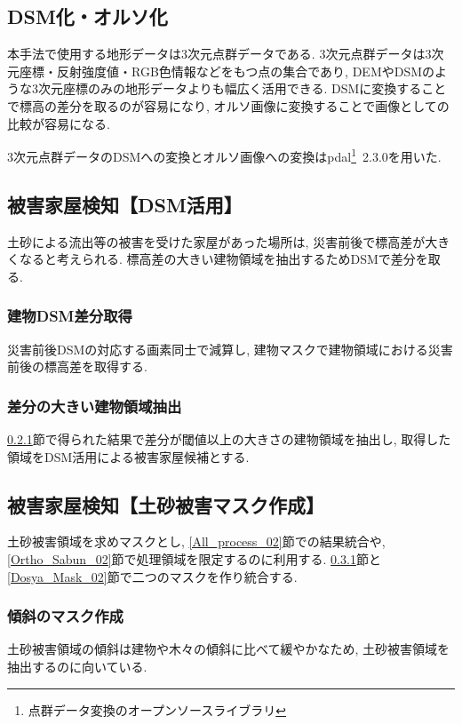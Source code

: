 \documentclass[a4paper, twocolumn, xelatex, 10pt, ja=standard, Ligatures=TeX]{bxjsarticle}
\begin{document}
		\subsection{DSM化・オルソ化}\label{All_process_01}
			本手法で使用する地形データは3次元点群データである. 
			3次元点群データは3次元座標・反射強度値・RGB色情報などをもつ点の集合であり, DEMやDSMのような3次元座標のみの地形データよりも幅広く活用できる. 
			DSMに変換することで標高の差分を取るのが容易になり, オルソ画像に変換することで画像としての比較が容易になる. 

			3次元点群データのDSMへの変換とオルソ画像への変換はpdal\footnote{点群データ変換のオープンソースライブラリ}\ 2.3.0を用いた. 

		\subsection{被害家屋検知【DSM活用】}\label{DSM_Sabun}
			土砂による流出等の被害を受けた家屋があった場所は, 災害前後で標高差が大きくなると考えられる. 標高差の大きい建物領域を抽出するためDSMで差分を取る.  
			
			\subsubsection{建物DSM差分取得}\label{DSM_Sabun_01}
				災害前後DSMの対応する画素同士で減算し, 建物マスクで建物領域における災害前後の標高差を取得する. 
			
			\subsubsection{差分の大きい建物領域抽出}\label{DSM_Sabun_02}
				\ref{DSM_Sabun_01}節で得られた結果で差分が閾値以上の大きさの建物領域を抽出し, 取得した領域をDSM活用による被害家屋候補とする. 

		\subsection{被害家屋検知【土砂被害マスク作成】}\label{Dosya_Mask}
			土砂被害領域を求めマスクとし, \ref{All_process_02}節での結果統合や, \ref{Ortho_Sabun_02}節で処理領域を限定するのに利用する. 
			\ref{Dosya_Mask_01}節と\ref{Dosya_Mask_02}節で二つのマスクを作り統合する. 

			\subsubsection{傾斜のマスク作成}\label{Dosya_Mask_01}
				土砂被害領域の傾斜は建物や木々の傾斜に比べて緩やかなため, 土砂被害領域を抽出するのに向いている. 
				
\end{document}
